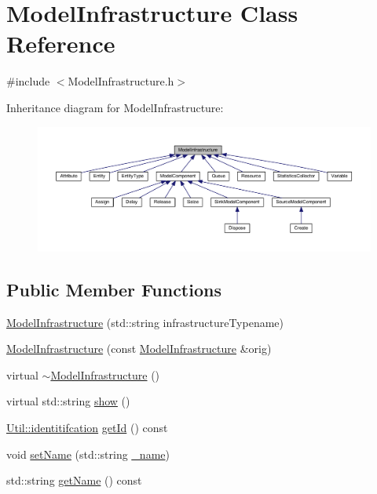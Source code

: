 \hypertarget{class_model_infrastructure}{}\section{Model\+Infrastructure Class Reference}
\label{class_model_infrastructure}


{\ttfamily \#include $<$Model\+Infrastructure.\+h$>$}



Inheritance diagram for Model\+Infrastructure\+:
\nopagebreak
\begin{figure}[H]
\begin{center}
\leavevmode
\includegraphics[width=350pt]{class_model_infrastructure__inherit__graph}
\end{center}
\end{figure}
\subsection*{Public Member Functions}
\begin{DoxyCompactItemize}
\item 
\hyperlink{class_model_infrastructure_aa7e7206a487b4e3ac89df8a23546a187}{Model\+Infrastructure} (std\+::string infrastructure\+Typename)
\item 
\hyperlink{class_model_infrastructure_a530efed59a4cd02b607849dc0538eddf}{Model\+Infrastructure} (const \hyperlink{class_model_infrastructure}{Model\+Infrastructure} \&orig)
\item 
virtual \hyperlink{class_model_infrastructure_aeedd4148c2b9c97600789f884c2ef549}{$\sim$\+Model\+Infrastructure} ()
\item 
virtual std\+::string \hyperlink{class_model_infrastructure_a649a5a89a0c9931783d3c51de2acf266}{show} ()
\item 
\hyperlink{class_util_ad17d458d9344b10bba64347e514d6d71}{Util\+::identitifcation} \hyperlink{class_model_infrastructure_aa4d3fa8f302cc6dc4fccdd3187e6a168}{get\+Id} () const 
\item 
void \hyperlink{class_model_infrastructure_a8ebb1f9b4475e732d31b6c8980ddccc0}{set\+Name} (std\+::string \hyperlink{class_model_infrastructure_aa73c0444ba8e3515e2aec3154eaad85d}{\+\_\+name})
\item 
std\+::string \hyperlink{class_model_infrastructure_ac06ca99d36c8d1a957697ef003e979b1}{get\+Name} () const 
\end{DoxyCompactItemize}
